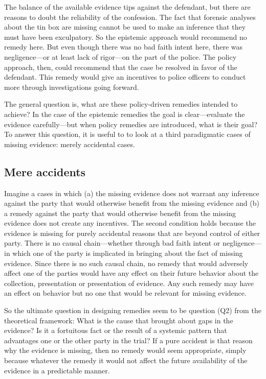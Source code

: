 \documentclass[
  10pt,
  dvipsnames,enabledeprecatedfontcommands]{scrartcl}
\begin{document}
The balance of the available evidence tips against the defendant, but
there are reasons to doubt the reliability of the confession. The fact
that forensic analyses about the tin box are missing cannot be used to
make an inference that they must have been exculpatory. So the epistemic
approach would recommend no remedy here. But even though there was no
bad faith intent here, there was negligence---or at least lack of
rigor---on the part of the police. The policy approach, then, could
recommend that the case be resolved in favor of the defendant. This
remedy would give an incentives to police officers to conduct more
through investigations going forward.

The general question is, what are these policy-driven remedies intended
to achieve? In the case of the epistemic remedies the goal is
clear---evaluate the evidence carefully---but when policy remedies are
introduced, what is their goal? To answer this question, it is useful to
to look at a third paradigmatic cases of missing evidence: merely
accidental cases.

\hypertarget{mere-accidents}{%
\subsection{Mere accidents}\label{mere-accidents}}

Imagine a cases in which (a) the missing evidence does not warrant any
inference against the party that would otherwise benefit from the
missing evidence and (b) a remedy against the party that would otherwise
benefit from the missing evidence does not create any incentives. The
second condition holds because the evidence is missing for purely
accidental reasons that are beyond control of either party. There is no
causal chain---whether through bad faith intent or negligence---in which
one of the party is implicated in bringing about the fact of missing
evidence. Since there is no such causal chain, no remedy that would
adversely affect one of the parties would have any effect on their
future behavior about the collection, presentation or presentation of
evidence. Any such remedy may have an effect on behavior but no one that
would be relevant for missing evidence.

So the ultimate question in designing remedies seem to be question (Q2)
from the theoretical framework: What is the cause that brought about
gaps in the evidence? Is it a fortuitous fact or the result of a
systemic pattern that advantages one or the other party in the trial? If
a pure accident is that reason why the evidence is missing, then no
remedy would seem appropriate, simply because whatever the remedy it
would not affect the future availability of the evidence in a
predictable manner.
\end{document}
